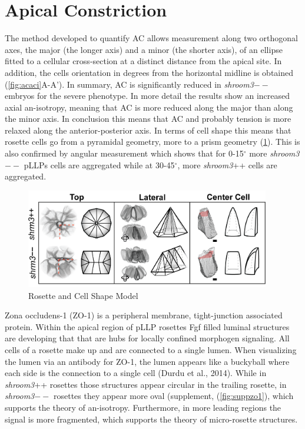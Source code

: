 \documentclass[11pt,singlespacinge,twoside]{reedthesis} %
\begin{document}
\hypertarget{apical-constriction-2}{%
\section{Apical Constriction}\label{apical-constriction-2}}

The method developed to quantify AC allows measurement along two orthogonal axes, the major (the longer axis) and a minor (the shorter axis), of an ellipse fitted to a cellular cross-section at a distinct distance from the apical site. In addition, the cells orientation in degrees from the horizontal midline is obtained (\ref{fig:acaci}A-A').
In summary, AC is significantly reduced in \emph{shroom3}\(--\) embryos for the severe phenotype. In more detail the results show an increased axial an-isotropy, meaning that AC is more reduced along the major than along the minor axis. In conclusion this means that AC and probably tension is more relaxed along the anterior-posterior axis. In terms of cell shape this means that rosette cells go from a pyramidal geometry, more to a prism geometry (\ref{fig:sumcells}). This is also confirmed by angular measurement which shows that for 0-15\(^\circ\) more \emph{shroom3}\(--\) pLLPs cells are aggregated while at 30-45\(^\circ\), more \emph{shroom3}++ cells are aggregated.


\begin{figure}

{\centering \includegraphics[width=0.95\textwidth]{figures/summary/cell-model} 

}

\caption[Rosette and Cell Shape Model]{Rosette and Cell Shape Model}\label{fig:sumcells}
\end{figure}
Zona occludens-1 (ZO-1) is a peripheral membrane, tight-junction associated protein. Within the apical region of pLLP rosettes Fgf filled luminal structures are developing that that are hubs for locally confined morphogen signaling. All cells of a rosette make up and are connected to a single lumen. When visualizing the lumen via an antibody for ZO-1, the lumen appears like a buckyball where each side is the connection to a single cell (Durdu et al., 2014). While in \emph{shroom3}++ rosettes those structures appear circular in the trailing rosette, in \emph{shroom3}\(--\) rosettes they appear more oval (supplement, (\ref{fig:suppzo1}), which supports the theory of an-isotropy. Furthermore, in more leading regions the signal is more fragmented, which supports the theory of micro-rosette structures.
\end{document}

